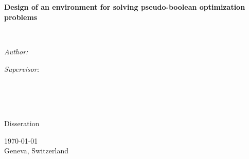 \documentclass[
11pt, %
oneside, %
english, %
singlespacing, %
headsepline, %
]{MastersDoctoralThesis} %
\author{Marc \textsc{Benedí}} %
\newcommand{\projectTitle}{Design of an environment for solving pseudo-boolean optimization problems}
\newcommand{\courseName}{Disseration}
\newcommand{\city}{Geneva, Switzerland}
\begin{document}
\frontmatter %

\pagestyle{plain} %


\begin{titlepage}
\begin{center}

\vspace*{.06\textheight}
{\scshape\LARGE \univname\par}\vspace{1.5cm} %
\textsc{\Large \ttitle}\\[0.5cm] %

\HRule \\[0.4cm] %
{\huge \bfseries \projectTitle\par}\vspace{0.4cm} %
\HRule \\[1.5cm] %
 
\begin{minipage}[t]{0.4\textwidth}
\begin{flushleft} \large
\emph{Author:}\\
\href{http://marcb.pro}{\authorname} %
\end{flushleft}
\end{minipage}
\begin{minipage}[t]{0.4\textwidth}
\begin{flushright} \large
\emph{Supervisor:} \\
\href{https://www.cs.upc.edu/~jordicf/}{\supname} %
\end{flushright}
\end{minipage}\\[3cm]
 
\vfill

\large \textit{ }\\[0.3cm] %
\textit{ }\\[0.4cm]
\courseName\\[2cm]
\vfill

{\large \today \\ \city}\\[4cm] %
 
\vfill
\end{center}
\end{titlepage}
\end{document}
